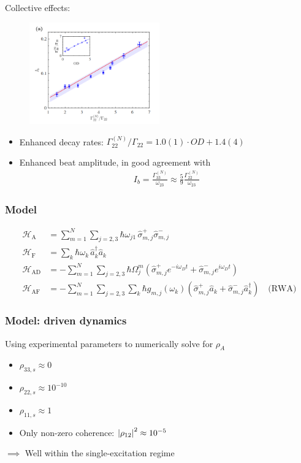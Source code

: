 \documentclass{beamer}
\theoremstyle{definition}
\newcommand{\lp}{\left(}
\newcommand{\rp}{\right)}
\newcommand{\f}[2]{\frac{#1}{#2}}
\begin{document}
\begin{frame}
	Collective effects:
	\begin{figure}[!htb]
		\centering
		\includegraphics[width=0.5\textwidth]{data_Ib.png}
	\end{figure}
\begin{itemize}
	\item Enhanced decay rates: $\Gamma_{22}^{(N)}/\Gamma_{22} = 1.0(1) \cdot OD + 1.4(4)$
	
	\item Enhanced beat amplitude, in good agreement with
	\begin{align*}
	I_b = \f{\Gamma_{33}^{(N)}}{\omega_{23}} \approx \f{5}{9} \f{\Gamma_{22}^{(N)}}{\omega_{23}}
	\end{align*}
\end{itemize}
	
	


\end{frame}


\begin{frame}
	\frametitle{Model}
	\begin{align*}
	\mathcal{H}_\text{A} &= \sum_{m=1}^N \sum_{j=2,3} \hbar \omega_{j1}\, \hat\sigma_{m,j}^+ \hat\sigma_{m,j}^-  \\
	\mathcal{H}_\text{F} &= \sum_k \hbar \omega_k \, \hat a_k^\dagger \hat a_k\\
	\mathcal{H}_\text{AD} &= -\sum^N_{m=1}\sum_{j=2,3} \hbar \Omega^m_j \lp \hat \sigma_{m,j}^+ e^{-i \omega_D t} + \hat \sigma_{m,j}^- e^{i\omega_D t} \rp \\
	\mathcal{H}_\text{AF} &= -\sum^N_{m=1}\sum_{j=2,3} \sum_k \hbar g_{m,j}(\omega_k) \lp \hat \sigma_{m,j}^+ \hat a_k + \hat \sigma^-_{m,j} \hat a^\dagger_k\rp \quad \text{(RWA)}
	\end{align*}
\end{frame}


\begin{frame}
	\frametitle{Model: driven dynamics}
	
	Using experimental parameters to numerically solve for $\rho_A$
	\begin{itemize}
		\item $\rho_{33,s}\approx 0$
		\item $\rho_{22,s}\approx 10^{-10}$
		\item $\rho_{11,s}\approx 1$
		\item Only non-zero coherence: $\abs{\rho_{12}}^2 \approx 10^{-5}$
	\end{itemize}
$\implies$ Well within the single-excitation regime
\end{frame}
\end{document}
